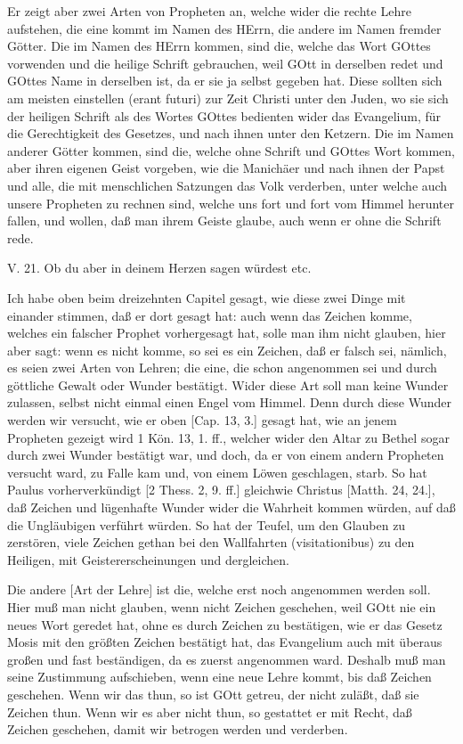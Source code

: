 Er zeigt aber zwei Arten von Propheten an, welche wider die rechte Lehre aufstehen, die eine kommt im Namen des HErrn, die andere im Namen fremder Götter. Die im Namen des HErrn kommen, sind die, welche das Wort GOttes vorwenden und die heilige Schrift gebrauchen, weil GOtt in derselben redet und GOttes Name in derselben ist, da er sie ja selbst gegeben hat. Diese sollten sich am meisten einstellen (erant futuri) zur Zeit Christi unter den Juden, wo sie sich der heiligen Schrift als des Wortes GOttes bedienten wider das Evangelium, für die Gerechtigkeit des Gesetzes, und nach ihnen unter den Ketzern. Die im Namen anderer Götter kommen, sind die, welche ohne Schrift und GOttes Wort kommen, aber ihren eigenen Geist vorgeben, wie die Manichäer und nach ihnen der Papst und alle, die mit menschlichen Satzungen das Volk verderben, unter welche auch unsere Propheten zu rechnen sind, welche uns fort und fort vom Himmel herunter fallen, und wollen, daß man ihrem Geiste glaube, auch wenn er ohne die Schrift rede.

\begin{schriftzitat}
V. 21. Ob du aber in deinem Herzen sagen würdest etc.
\end{schriftzitat}

Ich habe oben beim dreizehnten Capitel gesagt, wie diese zwei Dinge mit einander stimmen, daß er dort gesagt hat: auch wenn das Zeichen komme, welches ein falscher Prophet vorhergesagt hat, solle man ihm nicht glauben, hier aber sagt: wenn es nicht komme, so sei es ein Zeichen, daß er falsch sei, nämlich, es seien zwei Arten von Lehren; die eine, die schon angenommen sei und durch göttliche Gewalt oder Wunder bestätigt. Wider diese Art soll man keine Wunder zulassen, selbst nicht einmal einen Engel vom Himmel. Denn durch diese Wunder werden wir versucht, wie er oben [Cap. 13, 3.] gesagt hat, wie an jenem Propheten gezeigt wird 1 Kön. 13, 1. ff., welcher wider den Altar zu Bethel sogar durch zwei Wunder bestätigt war, und doch, da er von einem andern Propheten versucht ward, zu Falle kam und, von einem Löwen geschlagen, starb. So hat Paulus vorherverkündigt [2 Thess. 2, 9. ff.] gleichwie Christus [Matth. 24, 24.], daß Zeichen und lügenhafte Wunder wider die Wahrheit kommen würden, auf daß die Ungläubigen verführt würden. So hat der Teufel, um den Glauben zu zerstören, viele Zeichen gethan bei den Wallfahrten (visitationibus) zu den Heiligen, mit Geistererscheinungen und dergleichen.

Die andere [Art der Lehre] ist die, welche erst noch angenommen werden soll. Hier muß man nicht glauben, wenn nicht Zeichen geschehen, weil GOtt nie ein neues Wort geredet hat, ohne es durch Zeichen zu bestätigen, wie er das Gesetz Mosis mit den größten Zeichen bestätigt hat, das Evangelium auch mit überaus großen und fast beständigen, da es zuerst angenommen ward. Deshalb muß man seine Zustimmung aufschieben, wenn eine neue Lehre kommt, bis daß Zeichen geschehen. Wenn wir das thun, so ist GOtt getreu, der nicht zuläßt, daß sie Zeichen thun. Wenn wir es aber nicht thun, so gestattet er mit Recht, daß Zeichen geschehen, damit wir betrogen werden und verderben.

